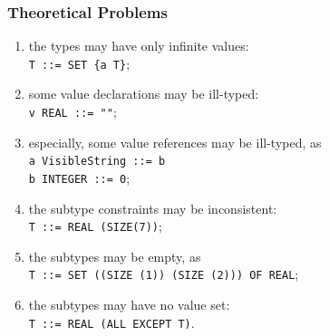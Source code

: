 \documentclass[compress,dvips,xcolor={dvipsnames},t]{beamer}
\begin{document}

\begin{frame}
\frametitle{Theoretical Problems}

\begin{enumerate}

  \item \label{finiteness} the types may have only infinite
        values:\\
        \texttt{T ::= SET \{a T\}};

  \item \label{type_conformance} some value declarations may be
        ill-typed:\\
        \texttt{v REAL ::= ""};

  \item \label{type_compatibility} especially, some value references
        may be ill-typed, as\\
        \texttt{a VisibleString ::= b}\\
        \texttt{b INTEGER ::= 0};

  \item \label{constraint_consistence} the subtype constraints may
        be inconsistent:\\
        \texttt{T ::= REAL (SIZE(7))};

  \item \label{subtype_non_emptiness} the subtypes may be empty, as\\
        \texttt{T ::= SET ((SIZE (1))  (SIZE (2))) OF REAL};

  \item \label{solvability} the subtypes may have no value set:\\
        \texttt{T ::= REAL (ALL EXCEPT T)}.

\end{enumerate}

\end{frame}

\end{document}
